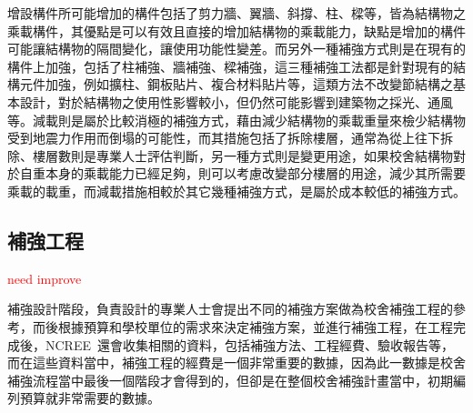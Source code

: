 增設構件所可能增加的構件包括了剪力牆、翼牆、斜撐、柱、樑等，皆為結構物之乘載構件，其優點是可以有效且直接的增加結構物的乘載能力，缺點是增加的構件可能讓結構物的隔間變化，讓使用功能性變差。而另外一種補強方式則是在現有的構件上加強，包括了柱補強、牆補強、樑補強，這三種補強工法都是針對現有的結構元件加強，例如擴柱、鋼板貼片、複合材料貼片等，這類方法不改變節結構之基本設計，對於結構物之使用性影響較小，但仍然可能影響到建築物之採光、通風等。減載則是屬於比較消極的補強方式，藉由減少結構物的乘載重量來檢少結構物受到地震力作用而倒塌的可能性，而其措施包括了拆除樓層，通常為從上往下拆除、樓層數則是專業人士評估判斷，另一種方式則是變更用途，如果校舍結構物對於自重本身的乘載能力已經足夠，則可以考慮改變部分樓層的用途，減少其所需要乘載的載重，而減載措施相較於其它幾種補強方式，是屬於成本較低的補強方式。


\subsection{補強工程}

\textcolor{red}{need improve}

補強設計階段，負責設計的專業人士會提出不同的補強方案做為校舍補強工程的參考，而後根據預算和學校單位的需求來決定補強方案，並進行補強工程，在工程完成後，NCREE~還會收集相關的資料，包括補強方法、工程經費、驗收報告等，而在這些資料當中，補強工程的經費是一個非常重要的數據，因為此一數據是校舍補強流程當中最後一個階段才會得到的，但卻是在整個校舍補強計畫當中，初期編列預算就非常需要的數據。




